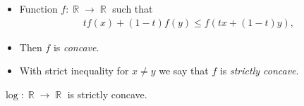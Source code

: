 \documentclass{beamer}
\DeclareMathOperator{\R}{\mathbb{R}}
\begin{document}
\begin{frame}
  \begin{definition}
    \begin{itemize}
      \item Function \(f\colon \R\to \R\) such that
        \begin{align*}
          tf(x) + (1-t)f(y) \leq f(tx + (1-t)y),
        \end{align*}

      \item Then \(f\) is \emph{concave}.
      \item With strict inequality for \(x\neq y\) we say that \(f\) is 
        \emph{strictly concave}.
    \end{itemize}
  \end{definition}

  \begin{example}
    \(\log\colon \R\to \R\) is strictly concave.
  \end{example}
\end{frame}

\begin{frame}[fragile]
\end{frame}

%
%
\end{document}
